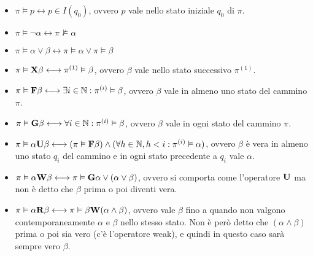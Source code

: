 \begin{itemize}
    \item $\pi \vDash p \longleftrightarrow p \in I(q_0)$, ovvero $p$ vale
    nello stato iniziale $q_0$ di $\pi$.
    \item $\pi \vDash \lnot \alpha \longleftrightarrow \pi \nvDash \alpha$
    \item $\pi \vDash \alpha \lor \beta \longleftrightarrow \pi \vDash \alpha \lor \pi \vDash \beta$
    \item $\pi \vDash \textnormal{\textbf{X}} \beta \longleftrightarrow \pi^{(1)} \vDash \beta$,
    ovvero $\beta$ vale nello stato successivo $\pi^{(1)}$.
    \item $\pi \vDash \textnormal{\textbf{F}} \beta \longleftrightarrow
    \exists i \in \mathbb{N} : \pi^{(i)} \vDash \beta$,
    ovvero $\beta$ vale in almeno uno stato del cammino $\pi$.
    \item $\pi \vDash \textnormal{\textbf{G}} \beta \longleftrightarrow
    \forall i \in \mathbb{N} : \pi^{(i)} \vDash \beta$,
    ovvero $\beta$ vale in ogni stato del cammino $\pi$.
    \item $\pi \vDash \alpha \textnormal{\textbf{U}} \beta \longleftrightarrow
    (\pi \vDash \textnormal{\textbf{F}} \beta) \land
    (\forall h \in \mathbb{N}, h < i : \pi^{(i)} \vDash \alpha)$,
    ovvero $\beta$ è vera in almeno uno stato $q_i$ del cammino e in ogni stato
    precedente a $q_i$ vale $\alpha$.
    \item $\pi \vDash \alpha \textnormal{\textbf{W}} \beta \longleftrightarrow
    \pi \vDash \textnormal{\textbf{G}} \alpha \lor (\alpha \lor \beta)$, ovvero
    si comporta come l'operatore $\textnormal{\textbf{U}}$ ma non è detto che $\beta$ prima
    o poi diventi vera.
    \item $\pi \vDash \alpha \textnormal{\textbf{R}} \beta \longleftrightarrow
    \pi \vDash \beta \textnormal{\textbf{W}} (\alpha \land \beta)$, ovvero vale $\beta$
    fino a quando non valgono contemporaneamente $\alpha$ e $\beta$ nello
    stesso stato. Non è però detto che $(\alpha \land \beta)$ prima o
    poi sia vero (c'è l'operatore weak), e quindi in questo caso
    sarà sempre vero $\beta$.
\end{itemize}

